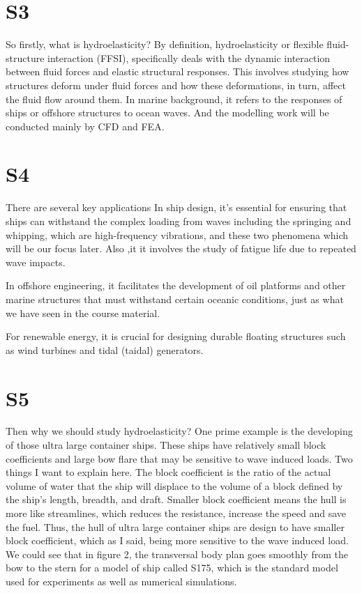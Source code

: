 \documentclass[17pt]{extarticle} %
\begin{document}
\setlength{\parskip}{1em} 
\setlength{\parindent}{0pt}
\newcommand{\vect}[1]{\mathbf{#1}}


\section*{S3}
So firstly, what is hydroelasticity? By definition, hydroelasticity or flexible fluid-structure interaction (FFSI), specifically deals with the dynamic interaction 
between fluid forces and elastic structural responses. This involves studying how structures deform under fluid forces and how these deformations, in turn, affect the fluid flow around them.
In marine background, it refers to the responses of ships or offshore structures to ocean waves. And the modelling work will be conducted mainly by CFD and FEA.

\section*{S4}
There are several key applications
In ship design, it's essential for ensuring that ships can withstand the complex loading from waves including the springing and whipping, which are high-frequency vibrations, and these two phenomena which will be our focus later. Also ,it it involves the study of fatigue life due to repeated wave impacts.

In offshore engineering, it facilitates the development of oil platforms and other marine structures that must withstand certain oceanic conditions, just as what we have seen in the course material.

For renewable energy, it is crucial for designing durable floating structures such as wind turbines and tidal (taidal) generators.

\section*{S5}
Then why we should study hydroelasticity?
One prime example is the developing of those ultra large container ships. These ships have relatively small block coefficients and large bow flare
that may be sensitive to wave induced loads. Two things I want to explain here. The block coefficient is the ratio of the actual volume of water that the ship will displace
to the volume of a block defined by the ship's length, breadth, and draft. Smaller block coefficient means the hull is more like streamlines, which reduces the resistance, 
increase the speed and save the fuel. Thus, the hull of ultra large container ships are design to have smaller block coefficient, which as I said, being more sensitive to the wave induced load.
We could see that in figure 2, the transversal body plan goes smoothly from the bow to the stern for a model of ship called S175, which is the standard model used 
for experiments as well as numerical simulations. 
\end{document}
